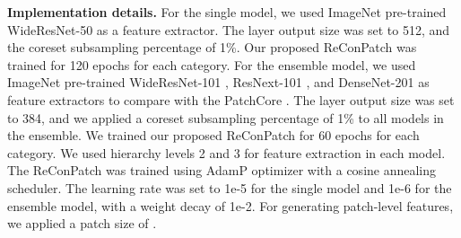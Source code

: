 \documentclass[10pt,onecolumn,letterpaper]{article}
\begin{document}
\textbf{Implementation details.}
For the single model, we used ImageNet pre-trained WideResNet-50 \cite{zagoruyko2016wide} as a feature extractor. The  layer output size was set to 512, and the coreset subsampling percentage of 1\%. Our proposed ReConPatch was trained for 120 epochs for each category.
For the ensemble model, we used ImageNet pre-trained WideResNet-101 \cite{zagoruyko2016wide}, ResNext-101 \cite{xie2017aggregated}, and DenseNet-201 \cite{huang2017densely} as feature extractors to compare with the PatchCore \cite{roth2022towards}. The  layer output size was set to 384, and we applied a coreset subsampling percentage of 1\% to all models in the ensemble. We trained our proposed ReConPatch for 60 epochs for each category. We used hierarchy levels 2 and 3 for feature extraction in each model. The ReConPatch was trained using AdamP \cite{heo2020adamp} optimizer with a cosine annealing \cite{loshchilov2016sgdr} scheduler. The learning rate was set to 1e-5 for the single model and 1e-6 for the ensemble model, with a weight decay of 1e-2. For generating patch-level features, we applied a patch size of .


\begin{table}[]
\caption{Results of the ablation study on coreset subsampling percentage using our proposed ReConPatch model with WideResNet-50 backbone on the MVTec AD dataset.}
\label{table:1}
\end{table}

\begin{table}[]
\caption{Ablation study results for  layer dimension on the MVTec AD dataset using our proposed ReConPatch model with a WideResNet-50 backbone.}
\label{table:2}
\end{table}
\end{document}

